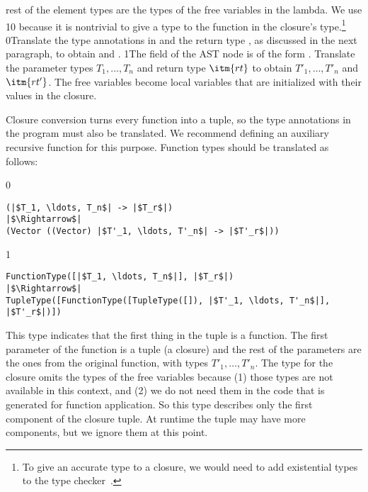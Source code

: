 \documentclass[7x10]{TimesAPriori_MIT}%
\def\racketEd{0}
\def\pythonEd{1}
\def\edition{1}
\newcommand{\racket}[1]{{\if\edition\racketEd{#1}\fi}}
\newcommand{\pythonColor}[0]{}
\newcommand{\python}[1]{{\if\edition\pythonEd\pythonColor #1\fi}}
\numberwithin{theorem}{chapter}
\numberwithin{definition}{chapter}
\numberwithin{equation}{chapter}
\begin{document}
rest of the element types are the types of the free variables in the
lambda. We use \python{}\racket{\code{\_}} because it
is nontrivial to give a type to the function in the closure's
type.\footnote{To give an accurate type to a closure, we would need to
  add existential types to the type checker~\citep{Minamide:1996ys}.}
%
\racket{Translate the type
  annotations in  and the return type \itm{rt}, as discussed in
  the next paragraph, to obtain \itm{ps'} and \itm{rt'}.}%
\python{The  field of the  AST node
  is of the form \code{FunctionType([$x_1:T_1,\ldots, x_n:T_n$], $rt$)}.
  Translate the parameter types $T_1,\ldots,T_n$ and return type $\itm{rt}$
  to obtain $T'_1,\ldots, T'_n$ and $\itm{rt'}$.}
The free variables become local variables that are initialized with
their values in the closure.

Closure conversion turns every function into a tuple, so the type
annotations in the program must also be translated.  We recommend
defining an auxiliary recursive function for this purpose.  Function
types should be translated as follows:
%
{\if\edition\racketEd
\begin{lstlisting}
(|$T_1, \ldots, T_n$| -> |$T_r$|)
|$\Rightarrow$|  
(Vector ((Vector) |$T'_1, \ldots, T'_n$| -> |$T'_r$|))
\end{lstlisting}
\fi}
{\if\edition\pythonEd\pythonColor
\begin{lstlisting}
FunctionType([|$T_1, \ldots, T_n$|], |$T_r$|)
|$\Rightarrow$|  
TupleType([FunctionType([TupleType([]), |$T'_1, \ldots, T'_n$|], |$T'_r$|)])
\end{lstlisting}
\fi}
%
This type indicates that the first thing in the tuple is a
function. The first parameter of the function is a tuple (a closure)
and the rest of the parameters are the ones from the original
function, with types $T'_1, \ldots, T'_n$.  The type for the closure
omits the types of the free variables because (1) those types are not
available in this context, and (2) we do not need them in the code that
is generated for function application. So this type describes only the
first component of the closure tuple. At runtime the tuple may have
more components, but we ignore them at this point.
\end{document}

